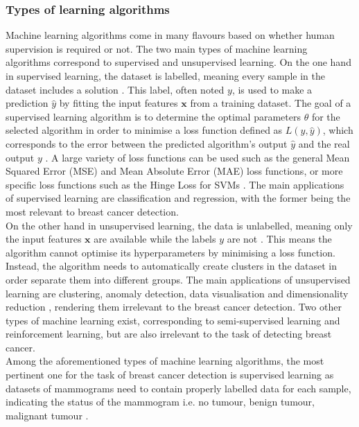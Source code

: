 \subsubsection{Types of learning algorithms}

Machine learning algorithms come in many flavours based on whether human supervision is required or not. The two main types of machine learning algorithms correspond to supervised and unsupervised learning. On the one hand in supervised learning, the dataset is labelled, meaning every sample in the dataset includes a solution \cite{Geron2019}. This label, often noted $y$, is used to make a prediction $\hat{y}$ by fitting the input features $\textbf{x}$ from a training dataset. The goal of a supervised learning algorithm is to determine the optimal parameters $\theta$ for the selected algorithm in order to minimise a loss function defined as $L(y,\hat{y})$, which corresponds to the error between the predicted algorithm's output $\hat{y}$ and the real output $y$ \cite{Litjens2017}. A large variety of loss functions can be used such as the general Mean Squared Error (MSE) and Mean Absolute Error (MAE) loss functions, or more specific loss functions such as the Hinge Loss for SVMs \cite{Geron2019}. The main applications of supervised learning are classification and regression, with the former being the most relevant to breast cancer detection.\\

On the other hand in unsupervised learning, the data is unlabelled, meaning only the input features $\textbf{x}$ are available while the labels $y$ are not \cite{Litjens2017}. This means the algorithm cannot optimise its hyperparameters by minimising a loss function. Instead, the algorithm needs to automatically create clusters in the dataset in order separate them into different groups. The main applications of unsupervised learning are clustering, anomaly detection, data visualisation and dimensionality reduction \cite{Geron2019}, rendering them irrelevant to the breast cancer detection. Two other types of machine learning exist, corresponding to semi-supervised learning and reinforcement learning, but are also irrelevant to the task of detecting breast cancer.\\

Among the aforementioned types of machine learning algorithms, the most pertinent one for the task of breast cancer detection is supervised learning as datasets of mammograms need to contain properly labelled data for each sample, indicating the status of the mammogram i.e. no tumour, benign tumour, malignant tumour \cite{Shen2017}.

